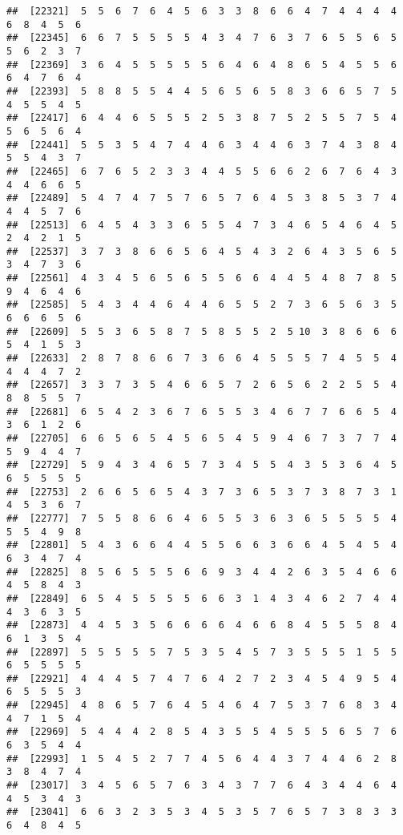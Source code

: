 \documentclass[
]{book}
\begin{document}
\begin{verbatim}
##  [22321]  5  5  6  7  6  4  5  6  3  3  8  6  6  4  7  4  4  4  4  6  8  4  5  6
##  [22345]  6  6  7  5  5  5  5  4  3  4  7  6  3  7  6  5  5  6  5  5  6  2  3  7
##  [22369]  3  6  4  5  5  5  5  5  6  4  6  4  8  6  5  4  5  5  6  6  4  7  6  4
##  [22393]  5  8  8  5  5  4  4  5  6  5  6  5  8  3  6  6  5  7  5  4  5  5  4  5
##  [22417]  6  4  4  6  5  5  5  2  5  3  8  7  5  2  5  5  7  5  4  5  6  5  6  4
##  [22441]  5  5  3  5  4  7  4  4  6  3  4  4  6  3  7  4  3  8  4  5  5  4  3  7
##  [22465]  6  7  6  5  2  3  3  4  4  5  5  6  6  2  6  7  6  4  3  4  4  6  6  5
##  [22489]  5  4  7  4  7  5  7  6  5  7  6  4  5  3  8  5  3  7  4  4  4  5  7  6
##  [22513]  6  4  5  4  3  3  6  5  5  4  7  3  4  6  5  4  6  4  5  2  4  2  1  5
##  [22537]  3  7  3  8  6  6  5  6  4  5  4  3  2  6  4  3  5  6  5  3  4  7  3  6
##  [22561]  4  3  4  5  6  5  6  5  5  6  6  4  4  5  4  8  7  8  5  9  4  6  4  6
##  [22585]  5  4  3  4  4  6  4  4  6  5  5  2  7  3  6  5  6  3  5  6  6  6  5  6
##  [22609]  5  5  3  6  5  8  7  5  8  5  5  2  5 10  3  8  6  6  6  5  4  1  5  3
##  [22633]  2  8  7  8  6  6  7  3  6  6  4  5  5  5  7  4  5  5  4  4  4  4  7  2
##  [22657]  3  3  7  3  5  4  6  6  5  7  2  6  5  6  2  2  5  5  4  8  8  5  5  7
##  [22681]  6  5  4  2  3  6  7  6  5  5  3  4  6  7  7  6  6  5  4  3  6  1  2  6
##  [22705]  6  6  5  6  5  4  5  6  5  4  5  9  4  6  7  3  7  7  4  5  9  4  4  7
##  [22729]  5  9  4  3  4  6  5  7  3  4  5  5  4  3  5  3  6  4  5  6  5  5  5  5
##  [22753]  2  6  6  5  6  5  4  3  7  3  6  5  3  7  3  8  7  3  1  4  5  3  6  7
##  [22777]  7  5  5  8  6  6  4  6  5  5  3  6  3  6  5  5  5  5  4  5  5  4  9  8
##  [22801]  5  4  3  6  6  4  4  5  5  6  6  3  6  6  4  5  4  5  4  6  3  4  7  4
##  [22825]  8  5  6  5  5  5  6  6  9  3  4  4  2  6  3  5  4  6  6  4  5  8  4  3
##  [22849]  6  5  4  5  5  5  5  6  6  3  1  4  3  4  6  2  7  4  4  4  3  6  3  5
##  [22873]  4  4  5  3  5  6  6  6  6  4  6  6  8  4  5  5  5  8  4  6  1  3  5  4
##  [22897]  5  5  5  5  5  7  5  3  5  4  5  7  3  5  5  5  1  5  5  6  5  5  5  5
##  [22921]  4  4  4  5  7  4  7  6  4  2  7  2  3  4  5  4  9  5  4  6  5  5  5  3
##  [22945]  4  8  6  5  7  6  4  5  4  6  4  7  5  3  7  6  8  3  4  4  7  1  5  4
##  [22969]  5  4  4  4  2  8  5  4  3  5  5  4  5  5  5  6  5  7  6  6  3  5  4  4
##  [22993]  1  5  4  5  2  7  7  4  5  6  4  4  3  7  4  4  6  2  8  3  8  4  7  4
##  [23017]  3  4  5  6  5  7  6  3  4  3  7  7  6  4  3  4  4  6  4  4  5  3  4  3
##  [23041]  6  6  3  2  3  5  3  4  5  3  5  7  6  5  7  3  8  3  3  6  4  8  4  5

\end{verbatim}
\end{document}
